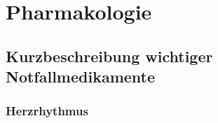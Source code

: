 \chapter{\CC{[PHA]} Pharmakologie}
\label{chp:PHA}


\minitoc






\section{Kurzbeschreibung wichtiger Notfallmedikamente}


\subsection{Herzrhythmus}
% 
